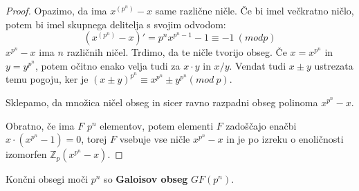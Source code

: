 \documentclass[11pt, a4paper]{article}
\begin{document}
    \begin{proof}
        Opazimo, da ima \(x^{(p^n)} - x\) same različne ničle. Če bi imel večkratno ničlo, potem bi imel skupnega delitelja s svojim odvodom:
        \[(x^{(p^n)} - x)' = p^n x^{p^n - 1} - 1 \equiv -1\ (mod p)\]
        \(x^{p^n} - x\) ima \(n\) različnih ničel. Trdimo, da te ničle tvorijo obseg. Če \(x = x^{p^n}\) in \(y = y^{p^n}\), potem očitno enako velja tudi za \(x \cdot y\) in \(x / y\). Vendat tudi \(x \pm y\) ustrezata temu pogoju, ker je \((x \pm y)^{p^n} \equiv x^{p^n} \pm y^{p^n} (mod\ p)\).
        \par
        Sklepamo, da množica ničel obseg in sicer ravno razpadni obseg polinoma \(x^{p^n} - x\).
        \par
        Obratno, če ima \(F\) \(p^n\) elementov, potem elementi \(F\) zadoščajo enačbi \(x \cdot (x^{p^n} - 1) = 0\), torej \(F\) vsebuje vse ničle \(x^{p^n} - x\) in je po izreku o enoličnosti izomorfen \(\mathbb{Z}_p (x^{p^n} - x)\).
    \end{proof}

    \begin{definition}
        Končni obsegi moči \(p^n\) so \textbf{Galoisov obseg} \(GF(p^n)\).
    \end{definition}
\end{document}
